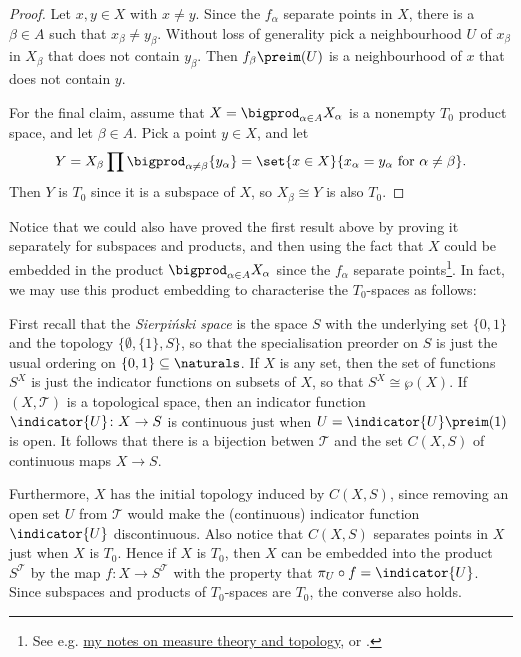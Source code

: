\documentclass[article, a4paper, 11pt, oneside]{memoir}
\numberwithin{equation}{chapter}
\newcommand{\calT}{\mathcal{T}}
\begin{document}
\begin{proof}
    Let $x,y \in X$ with $x \neq y$. Since the $f_\alpha$ separate points in $X$, there is a $\beta \in A$ such that $x_\beta \neq y_\beta$. Without loss of generality pick a neighbourhood $U$ of $x_\beta$ in $X_\beta$ that does not contain $y_\beta$. Then $f_\beta\preim(U)$ is a neighbourhood of $x$ that does not contain $y$.

    For the final claim, assume that $X = \bigprod_{\alpha \in A} X_\alpha$ is a nonempty $T_0$ product space, and let $\beta \in A$. Pick a point $y \in X$, and let
    \begin{equation*}
        Y
            = X_\beta \prod \bigprod_{\alpha \neq \beta} \{y_\alpha\}
            = \set{x \in X}{x_\alpha = y_\alpha \text{ for } \alpha \neq \beta}.
    \end{equation*}
    Then $Y$ is $T_0$ since it is a subspace of $X$, so $X_\beta \cong Y$ is also $T_0$.
\end{proof}
%
Notice that we could also have proved the first result above by proving it separately for subspaces and products, and then using the fact that $X$ could be embedded in the product $\bigprod_{\alpha \in A} X_\alpha$ since the $f_\alpha$ separate points\footnote{See e.g. \href{https://github.com/dnhansen/topology-measure-theory-notes}{my notes on measure theory and topology}, or \textcite[Theorem~8.12]{willard}.}. In fact, we may use this product embedding to characterise the $T_0$-spaces as follows:

\renewcommand{\powerset}[1]{\wp(#1)}

First recall that the \emph{Sierpi\'nski space} is the space $S$ with the underlying set $\{0,1\}$ and the topology $\{\emptyset, \{1\}, S\}$, so that the specialisation preorder on $S$ is just the usual ordering on $\{0,1\} \subseteq \naturals$. If $X$ is any set, then the set of functions $S^X$ is just the indicator functions on subsets of $X$, so that $S^X \cong \powerset{X}$. If $(X,\calT)$ is a topological space, then an indicator function $\indicator{U} \colon X \to S$ is continuous just when $U = \indicator{U}\preim(1)$ is open. It follows that there is a bijection betwen $\calT$ and the set $C(X,S)$ of continuous maps $X \to S$.

Furthermore, $X$ has the initial topology induced by $C(X,S)$, since removing an open set $U$ from $\calT$ would make the (continuous) indicator function $\indicator{U}$ discontinuous. Also notice that $C(X,S)$ separates points in $X$ just when $X$ is $T_0$. Hence if $X$ is $T_0$, then $X$ can be embedded into the product $S^\calT$ by the map $f \colon X \to S^\calT$ with the property that $\pi_U \circ f = \indicator{U}$. Since subspaces and products of $T_0$-spaces are $T_0$, the converse also holds.
\end{document}
